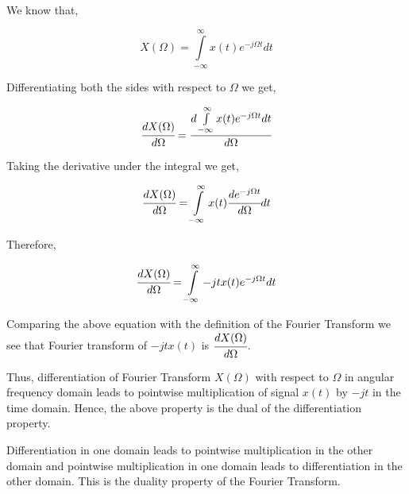 \noindent
We know that,

$$X(\Omega) = \int\limits_{-\infty}^{\infty}x(t)e^{-j\Omega t}dt$$

\noindent
Differentiating both the sides with respect to $\Omega$ we get,

$$\cfrac{dX(\Omega)}{d\Omega} = \cfrac{d\int\limits_{-\infty}^{\infty}x(t)e^{-j\Omega t}dt}{d\Omega}$$

\noindent
Taking the derivative under the integral we get, 

$$\cfrac{dX(\Omega)}{d\Omega} = \int\limits_{-\infty}^{\infty}x(t)\cfrac{de^{-j\Omega t}}{d\Omega}dt$$

\noindent
Therefore,


$$\cfrac{dX(\Omega)}{d\Omega} = \int\limits_{-\infty}^{\infty}-jtx(t)e^{-j\Omega t}dt$$


\noindent
Comparing the above equation with the definition of the Fourier Transform we see that Fourier transform of $-jtx(t)$ is $\cfrac{dX(\Omega)}{d\Omega}$.

\noindent
Thus, differentiation of Fourier Transform $X(\Omega)$ with respect to $\Omega$ in angular frequency domain leads to pointwise multiplication of signal $x(t)$ by $-jt$ in the time domain. Hence, the above property is the dual of the differentiation property.

\noindent
Differentiation in one domain leads to pointwise multiplication in the other domain and pointwise multiplication in one domain leads to differentiation in the other domain. This is the duality property of the Fourier Transform.






